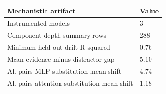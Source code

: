 \begin{tabularx}{\linewidth}{@{}lX@{}}
\toprule
\textbf{Mechanistic artifact} & \textbf{Value} \\
\midrule
Instrumented models & 3 \\
Component-depth summary rows & 288 \\
Minimum held-out drift R-squared & 0.76 \\
Mean evidence-minus-distractor gap & 5.10 \\
All-pairs MLP substitution mean shift & 4.74 \\
All-pairs attention substitution mean shift & 1.18 \\
\bottomrule
\end{tabularx}

